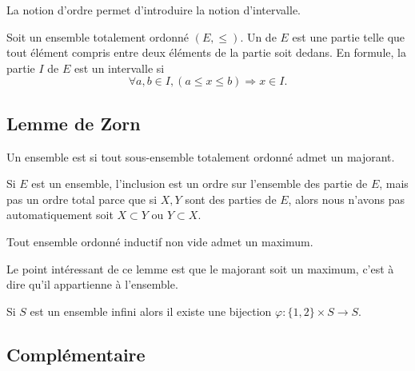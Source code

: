 La notion d'ordre permet d'introduire la notion d'intervalle.

\begin{definition}  \label{DefEYAooMYYTz}
    Soit un ensemble totalement ordonné \( (E,\leq)\). Un  de \( E\) est une partie telle que tout élément compris entre deux éléments de la partie soit dedans. En formule, la partie $I$ de \( E\) est un intervalle si
    \[
      \forall a,b\in I,(a\leq x\leq b)\Rightarrow x\in I.
    \]
\end{definition}

\subsection{Lemme de Zorn}

\begin{definition}  \label{DefGHDfyyz}
    Un ensemble est  si tout sous-ensemble totalement ordonné admet un majorant.
\end{definition}

Si \( E\) est un ensemble, l'inclusion est un ordre sur l'ensemble des partie de \( E\), mais pas un ordre total parce que si \( X,Y\) sont des parties de \( E\), alors nous n'avons pas automatiquement soit \( X\subset Y\) ou \( Y\subset X\).

\begin{lemma}    \label{LemUEGjJBc}
    Tout ensemble ordonné inductif non vide admet un maximum.
\end{lemma}
Le point intéressant de ce lemme est que le majorant soit un maximum, c'est à dire qu'il appartienne à l'ensemble.

\begin{proposition} \label{PropVCSooMzmIX}
    Si \( S\) est un ensemble infini alors il existe une bijection \( \varphi\colon \{ 1,2 \}\times S\to S\).
\end{proposition}

\subsection{Complémentaire}
\label{AppComplement}

